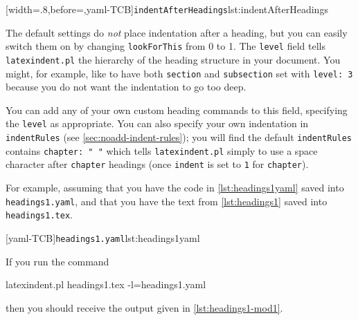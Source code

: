  [width=.8\linewidth,before=\centering,yaml-TCB]{\texttt{indentAfterHeadings}}{lst:indentAfterHeadings}

 The default settings do \emph{not} place indentation after a heading, but you can easily
 switch them on by changing \texttt{lookForThis} from 0 to 1. The \texttt{level} field
 tells \texttt{latexindent.pl} the hierarchy of the heading structure in your document.
 You might, for example, like to have both \texttt{section} and \texttt{subsection} set
 with \texttt{level: 3} because you do not want the indentation to go too deep.

 You can add any of your own custom heading commands to this field, specifying the
 \texttt{level} as appropriate. You can also specify your own indentation in
 \texttt{indentRules} (see \vref{sec:noadd-indent-rules}); you will find the default
 \texttt{indentRules} contains \lstinline!chapter: " "! which tells
 \texttt{latexindent.pl} simply to use a space character after \texttt{chapter} headings
 (once \texttt{indent} is set to \texttt{1} for \texttt{chapter}).

 \begin{example}
 For example, assuming that you have the code in \cref{lst:headings1yaml} saved into
 \texttt{headings1.yaml}, and that you have the text from \cref{lst:headings1} saved into
 \texttt{headings1.tex}.

 \begin{cmhtcbraster}
  [yaml-TCB]{\texttt{headings1.yaml}}{lst:headings1yaml}
 \end{cmhtcbraster}

 If you run the command 

 \begin{commandshell}
latexindent.pl headings1.tex -l=headings1.yaml
\end{commandshell}

 then you should receive the output given in \cref{lst:headings1-mod1}.

 \begin{minipage}{.45\textwidth}
 \end{minipage}%
 \hfill
 \begin{minipage}{.45\textwidth}
 \end{minipage}
 \end{example}

